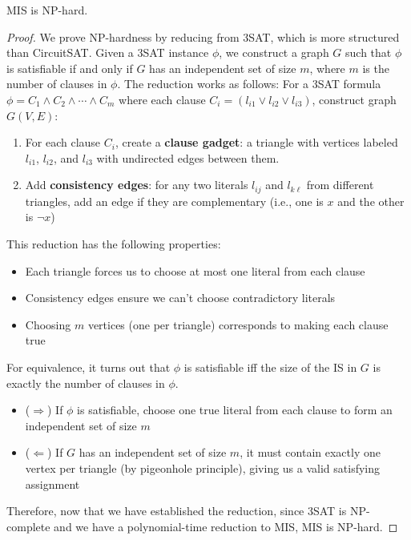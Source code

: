     \begin{theorem}
      MIS is NP-hard.
    \end{theorem}
    \begin{proof}
      We prove NP-hardness by reducing from 3SAT, which is more structured than CircuitSAT. Given a 3SAT instance $\phi$, we construct a graph $G$ such that $\phi$ is satisfiable if and only if $G$ has an independent set of size $m$, where $m$ is the number of clauses in $\phi$. The reduction works as follows: For a 3SAT formula $\phi = C_1 \land C_2 \land \cdots \land C_m$ where each clause $C_i = (l_{i1} \lor l_{i2} \lor l_{i3})$, construct graph $G(V,E)$:

      \begin{enumerate}
        \item For each clause $C_i$, create a \textbf{clause gadget}: a triangle with vertices labeled $l_{i1}$, $l_{i2}$, and $l_{i3}$ with undirected edges between them. 
        \item Add \textbf{consistency edges}: for any two literals $l_{ij}$ and $l_{k\ell}$ from different triangles, add an edge if they are complementary (i.e., one is $x$ and the other is $\neg x$)
      \end{enumerate}

      This reduction has the following properties:
      \begin{itemize}
        \item Each triangle forces us to choose at most one literal from each clause
        \item Consistency edges ensure we can't choose contradictory literals
        \item Choosing $m$ vertices (one per triangle) corresponds to making each clause true
      \end{itemize}

      For equivalence, it turns out that $\phi$ is satisfiable iff the size of the IS in $G$ is exactly the number of clauses in $\phi$. 
      \begin{itemize}
        \item ($\Rightarrow$) If $\phi$ is satisfiable, choose one true literal from each clause to form an independent set of size $m$
        \item ($\Leftarrow$) If $G$ has an independent set of size $m$, it must contain exactly one vertex per triangle (by pigeonhole principle), giving us a valid satisfying assignment
      \end{itemize}

      Therefore, now that we have established the reduction, since 3SAT is NP-complete and we have a polynomial-time reduction to MIS, MIS is NP-hard.
    \end{proof}

